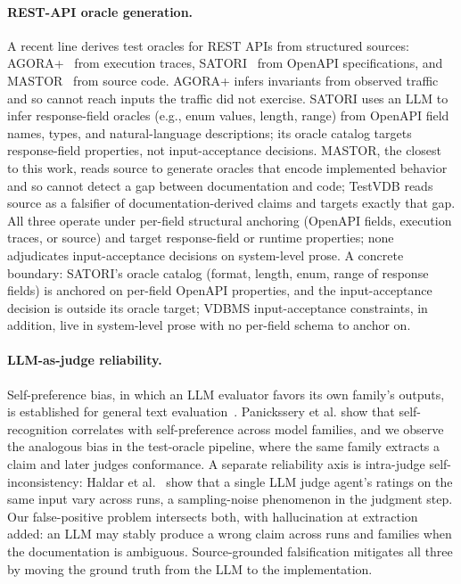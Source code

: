 \documentclass[sigconf]{acmart}
\begin{document}
\paragraph{REST-API oracle generation.}
A recent line derives test oracles for REST APIs from structured sources: AGORA+~\cite{agoraplus25} from execution traces, SATORI~\cite{satori25} from OpenAPI specifications, and MASTOR~\cite{mastor26} from source code. AGORA+ infers invariants from observed traffic and so cannot reach inputs the traffic did not exercise. SATORI uses an LLM to infer response-field oracles (e.g., enum values, length, range) from OpenAPI field names, types, and natural-language descriptions; its oracle catalog targets response-field properties, not input-acceptance decisions. MASTOR, the closest to this work, reads source to generate oracles that encode implemented behavior and so cannot detect a gap between documentation and code; TestVDB reads source as a falsifier of documentation-derived claims and targets exactly that gap. All three operate under per-field structural anchoring (OpenAPI fields, execution traces, or source) and target response-field or runtime properties; none adjudicates input-acceptance decisions on system-level prose. A concrete boundary: SATORI's oracle catalog (format, length, enum, range of response fields) is anchored on per-field OpenAPI properties, and the input-acceptance decision is outside its oracle target; VDBMS input-acceptance constraints, in addition, live in system-level prose with no per-field schema to anchor on.

\paragraph{LLM-as-judge reliability.}
Self-preference bias, in which an LLM evaluator favors its own family's outputs, is established for general text evaluation~\cite{panickssery24,wataoka24}. Panickssery et al. show that self-recognition correlates with self-preference across model families, and we observe the analogous bias in the test-oracle pipeline, where the same family extracts a claim and later judges conformance. A separate reliability axis is intra-judge self-inconsistency: Haldar et al.~\cite{haldar25} show that a single LLM judge agent's ratings on the same input vary across runs, a sampling-noise phenomenon in the judgment step. Our false-positive problem intersects both, with hallucination at extraction~\cite{ji23hall} added: an LLM may stably produce a wrong claim across runs and families when the documentation is ambiguous. Source-grounded falsification mitigates all three by moving the ground truth from the LLM to the implementation.
\end{document}
